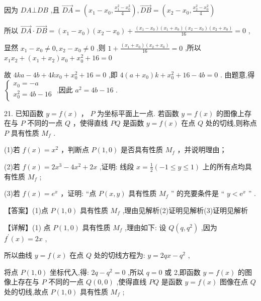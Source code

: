\documentclass[10pt]{article}
\begin{document}
因为 \({DA} \bot  {DB}\) ,且 \(\overrightarrow{DA} = \left( {{x}_{1} - {x}_{0},\frac{{x}_{1}^{2} - {x}_{0}^{2}}{4}}\right) ,\overrightarrow{DB} = \left( {{x}_{2} - {x}_{0},\frac{{x}_{2}^{2} - {x}_{0}^{2}}{4}}\right)\)

所以 \(\overrightarrow{DA} \cdot  \overrightarrow{DB} = \left( {{x}_{1} - {x}_{0}}\right) \left( {{x}_{2} - {x}_{0}}\right)  + \frac{\left( {{x}_{1} - {x}_{0}}\right) \left( {{x}_{1} + {x}_{0}}\right) \left( {{x}_{2} - {x}_{0}}\right) \left( {{x}_{2} + {x}_{0}}\right) }{16} = 0\) ,

显然 \({x}_{1} - {x}_{0} \neq  0,{x}_{2} - {x}_{0} \neq  0\) ,则 \(1 + \frac{\left( {{x}_{1} + {x}_{0}}\right) \left( {{x}_{2} + {x}_{0}}\right) }{16} = 0\) ,所以 \({x}_{1}{x}_{2} + \left( {{x}_{1} + {x}_{2}}\right) {x}_{0} + {x}_{0}^{2} + {16} = 0\)

故 \({4ka} - {4b} + {4k}{x}_{0} + {x}_{0}^{2} + {16} = 0\) ,即 \(4\left( {a + {x}_{0}}\right) k + {x}_{0}^{2} + {16} - {4b} = 0\) . 由题意,得 \(\left\{  \begin{array}{l} {x}_{0} =  - a \\  {x}_{0}^{2} = {4b} - {16} \end{array}\right.\) ,因此 \({a}^{2} = {4b} - {16}\) .

21. 已知函数 \(y = f\left( x\right)\) ， \(P\) 为坐标平面上一点. 若函数 \(y = f\left( x\right)\) 的图像上存在与 \(P\) 不同的一点 \(Q\) ，使得直线 \({PQ}\) 是函数 \(y = f\left( x\right)\) 在点 \(Q\) 处的切线,则称点 \(P\) 具有性质 \({M}_{f}\) .

(1)若 \(f\left( x\right)  = {x}^{2}\) ，判断点 \(P\left( {1,0}\right)\) 是否具有性质 \({M}_{f}\) ，并说明理由；

(2)若 \(f\left( x\right)  = 2{x}^{3} - 4{x}^{2} + {2x}\) ,证明: 线段 \(x = \frac{1}{2}\left( {-1 \leq  y \leq  1}\right)\) 上的所有点均具有性质 \({M}_{f}\) ;

(3)若 \(f\left( x\right)  = {e}^{x}\) ，证明: “点 \(P\left( {x,y}\right)\) 具有性质 \({M}_{f}\) ” 的充要条件是 “ \(y < {\mathrm{e}}^{x}\) ” .

【答案】(1)点 \(P\left( {1,0}\right)\) 具有性质 \({M}_{f}\) ,理由见解析(2)证明见解析(3)证明见解析

【详解】(1) 点 \(P\left( {1,0}\right)\) 具有性质 \({M}_{f}\) ,理由如下: 设 \(Q\left( {q,{q}^{2}}\right)\) ,因为 \({f}^{\prime }\left( x\right)  = {2x}\) ,

所以曲线 \(y = f\left( x\right)\) 在点 \(Q\) 处的切线方程为: \(y = {2qx} - {q}^{2}\) ,

将点 \(P\left( {1,0}\right)\) 坐标代入,得: \({2q} - {q}^{2} = 0\) ,所以 \(q = 0\) 或 2,即函数 \(y = f\left( x\right)\) 的图像上存在与 \(P\) 不同的一点 \(Q\left( {0,0}\right)\) ,使得直线 \({PQ}\) 是函数 \(y = f\left( x\right)\) 图像在点 \(Q\) 处的切线,故点 \(P\left( {1,0}\right)\) 具有性质 \({M}_{f}\) ;
\end{document}
